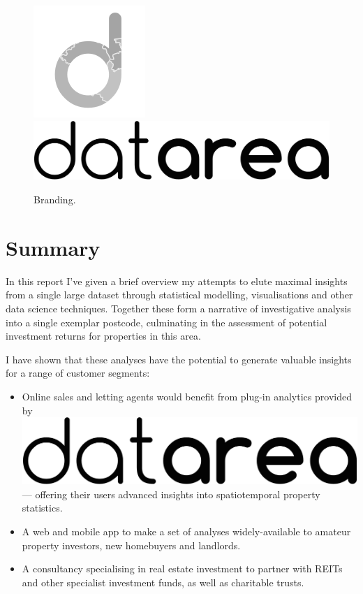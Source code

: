 \documentclass[
10pt, %
a4paper, %
oneside, %
headinclude,footinclude, %
BCOR5mm, %
]{scrartcl}
\newcommand*{\logo}{\includegraphics[scale=.04]{Figures/logotext.png}}
\begin{document}
\begin{figure}
\vspace{5em}
\centering
\includegraphics[width=.2\textwidth]{Figures/logo.png}
\includegraphics[width=.2\textwidth]{Figures/logotext.png}
\caption{ Branding. }
\end{figure}

\section*{Summary}

In this report I've given a brief overview my attempts to elute
maximal insights from a single large dataset through statistical
modelling, visualisations and other data science techniques. Together
these form a narrative of investigative analysis into a single
exemplar postcode, culminating in the assessment of potential investment
returns for properties in this area.

I have shown that these analyses have the potential to generate
valuable insights for a range of customer segments:

\begin{itemize}

\item Online sales and letting agents would benefit from
plug-in analytics provided by \logo \hspace{.1em} --- offering their
users advanced insights into spatiotemporal property statistics.

\item A web and mobile app to make a set of analyses widely-available
  to amateur property investors, new homebuyers and landlords.

\item A consultancy specialising in real estate investment to partner
  with REITs and other specialist investment funds, as well as
  charitable trusts.
\end{itemize}
\end{document}
